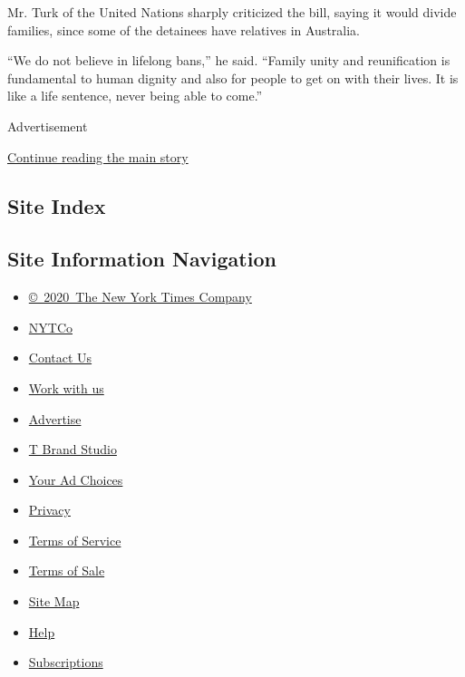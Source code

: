 Mr. Turk of the United Nations sharply criticized the bill, saying it
would divide families, since some of the detainees have relatives in
Australia.

``We do not believe in lifelong bans,'' he said. ``Family unity and
reunification is fundamental to human dignity and also for people to get
on with their lives. It is like a life sentence, never being able to
come.''

Advertisement

\protect\hyperlink{after-bottom}{Continue reading the main story}

\hypertarget{site-index}{%
\subsection{Site Index}\label{site-index}}

\hypertarget{site-information-navigation}{%
\subsection{Site Information
Navigation}\label{site-information-navigation}}

\begin{itemize}
\tightlist
\item
  \href{https://help.nytimes.com/hc/en-us/articles/115014792127-Copyright-notice}{©~2020~The
  New York Times Company}
\end{itemize}

\begin{itemize}
\tightlist
\item
  \href{https://www.nytco.com/}{NYTCo}
\item
  \href{https://help.nytimes.com/hc/en-us/articles/115015385887-Contact-Us}{Contact
  Us}
\item
  \href{https://www.nytco.com/careers/}{Work with us}
\item
  \href{https://nytmediakit.com/}{Advertise}
\item
  \href{http://www.tbrandstudio.com/}{T Brand Studio}
\item
  \href{https://www.nytimes.com/privacy/cookie-policy\#how-do-i-manage-trackers}{Your
  Ad Choices}
\item
  \href{https://www.nytimes.com/privacy}{Privacy}
\item
  \href{https://help.nytimes.com/hc/en-us/articles/115014893428-Terms-of-service}{Terms
  of Service}
\item
  \href{https://help.nytimes.com/hc/en-us/articles/115014893968-Terms-of-sale}{Terms
  of Sale}
\item
  \href{https://spiderbites.nytimes.com}{Site Map}
\item
  \href{https://help.nytimes.com/hc/en-us}{Help}
\item
  \href{https://www.nytimes.com/subscription?campaignId=37WXW}{Subscriptions}
\end{itemize}
